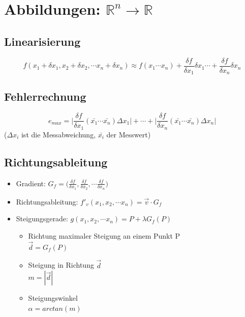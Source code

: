 \section{Abbildungen: $\mathbb{R}^n \rightarrow \mathbb{R}$}

\subsection{Linearisierung}
\begin{equation*}
	f(x_1 + \delta x_1, x_2 + \delta x_2, \cdots x_n + \delta x_n) \approx f(x_1 \cdots x_n) + \frac{\delta f}{\delta x_1} \delta x_1 \cdots + \frac{\delta f}{\delta x_n} \delta x_n
\end{equation*}

\subsection{Fehlerrechnung}
\begin{equation*}
	e_{max} = \bigg | \frac{\delta f}{\delta x_1}(\bar{x_1} \cdots \bar{x_n}) \Delta x_1 \bigg | + \cdots + \bigg | \frac{\delta f}{\delta x_n}(\bar{x_1} \cdots \bar{x_n}) \Delta x_n \bigg |
\end{equation*}
($\Delta x_i$ ist die Messabweichung, $\bar{x_i}$ der Messwert)

\subsection{Richtungsableitung}
\begin{itemize}
	\item Gradient:
		$G_f = \big(\frac{\delta f}{\delta x_1}, \frac{\delta f}{\delta x_2}, \cdots \frac{\delta f}{\delta x_n}\big )$
	\item Richtungsableitung:
		$f'_v(x_1, x_2, \cdots x_n) = \vec{v} \cdot G_f	$
	\item Steigungsgerade:
		$g(x_1, x_2, \cdots x_n) = P + \lambda G_f(P)$

		\begin{itemize}
			\item Richtung maximaler Steigung an einem Punkt P \\
			$\vec{d} = G_f(P)$
			\item Steigung in Richtung $\vec{d}$ \\ $m = |\vec{d}|$
			\item Steigungswinkel \\ $\alpha = arctan(m)$
		\end{itemize}
\end{itemize}

